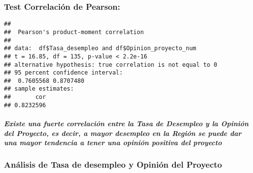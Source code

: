 \documentclass[
]{article}
\newenvironment{Shaded}{\begin{snugshade}}{\end{snugshade}}
\newcommand{\CommentTok}[1]{\textcolor[rgb]{0.56,0.35,0.01}{\textit{#1}}}
\newcommand{\FunctionTok}[1]{\textcolor[rgb]{0.13,0.29,0.53}{\textbf{#1}}}
\newcommand{\NormalTok}[1]{#1}
\newcommand{\OtherTok}[1]{\textcolor[rgb]{0.56,0.35,0.01}{#1}}
\newcommand{\SpecialCharTok}[1]{\textcolor[rgb]{0.81,0.36,0.00}{\textbf{#1}}}
\begin{document}
\subsubsection{\texorpdfstring{\textbf{Test Correlación de
Pearson:}}{Test Correlación de Pearson:}}\label{test-correlaciuxf3n-de-pearson}

\begin{Shaded}
\end{Shaded}

\begin{verbatim}
## 
##  Pearson's product-moment correlation
## 
## data:  df$Tasa_desempleo and df$Opinion_proyecto_num
## t = 16.85, df = 135, p-value < 2.2e-16
## alternative hypothesis: true correlation is not equal to 0
## 95 percent confidence interval:
##  0.7605568 0.8707480
## sample estimates:
##       cor 
## 0.8232596
\end{verbatim}

\subparagraph{\texorpdfstring{\emph{Existe una fuerte correlación entre
la Tasa de Desempleo y la Opinión del Proyecto, es decir, a mayor
desempleo en la Región se puede dar una mayor tendencia a tener una
opinión positiva del
proyecto}}{Existe una fuerte correlación entre la Tasa de Desempleo y la Opinión del Proyecto, es decir, a mayor desempleo en la Región se puede dar una mayor tendencia a tener una opinión positiva del proyecto}}\label{existe-una-fuerte-correlaciuxf3n-entre-la-tasa-de-desempleo-y-la-opiniuxf3n-del-proyecto-es-decir-a-mayor-desempleo-en-la-regiuxf3n-se-puede-dar-una-mayor-tendencia-a-tener-una-opiniuxf3n-positiva-del-proyecto}

\subsubsection{\texorpdfstring{\textbf{Análisis de Tasa de desempleo y
Opinión del
Proyecto}}{Análisis de Tasa de desempleo y Opinión del Proyecto}}\label{anuxe1lisis-de-tasa-de-desempleo-y-opiniuxf3n-del-proyecto}
\end{document}
